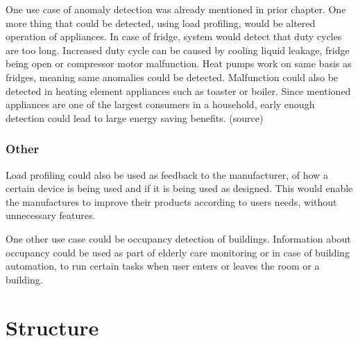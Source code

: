 \documentclass[
11pt, %
english, %
singlespacing, %
headsepline, %
]{MastersDoctoralThesis} %
\begin{document}
One use case of anomaly detection was already mentioned in prior chapter.
One more thing that could be detected, using load profiling, would be altered operation of appliances.
In case of fridge, system would detect that duty cycles are too long.
Increased duty cycle can be caused by cooling liquid leakage, fridge being open or compressor motor malfunction.
Heat pumps work on same basis as fridges, meaning same anomalies could be detected. 
Malfunction could also be detected in heating element appliances such as toaster or boiler. 
Since mentioned appliances are one of the largest consumers in a household, early enough detection could lead to large energy saving benefits. (source)

\subsubsection{Other}

Load profiling could also be used as feedback to the manufacturer,
of how a certain device is being used and if it is being used as designed. 
This would enable the manufactures to improve their products according to 
users needs, without unnecessary features.

One other use case could be occupancy detection of buildings. Information about 
occupancy could be used as part of elderly care monitoring or in case of building
automation, to run certain tasks when user enters or leaves the room or a building.

\section{Structure}
\end{document}
